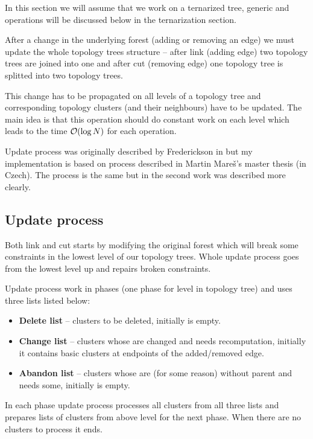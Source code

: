 In this section we will assume that we work on a ternarized tree, generic \Cut{}
and \Link{} operations will be discussed below in the ternarization section.

After a change in the underlying forest (adding or removing an edge) we must
update the whole topology trees structure -- after {\I link} (adding edge) two
topology trees are joined into one and after {\I cut} (removing edge) one
topology tree is splitted into two topology trees.

This change has to be propagated on all levels of a topology tree and
corresponding topology clusters (and their neighbours) have to be updated. The
main idea is that this operation should do constant work on each level which
leads to the time ${\cal O}(\log N)$ for each operation.

Update process was originally described by Frederickson in
\cite{DSforDynamicallyMaintainingRootedTrees} but my implementation is based on
process described in Martin Mareš's master thesis \cite{DGA} (in Czech). The
process is the same but in the second work was described more clearly.

\subsection{Update process}

Both link and cut starts by modifying the original forest which will break some
constraints in the lowest level of our topology trees. Whole update process
goes from the lowest level up and repairs broken constraints.

Update process work in phases (one phase for level in topology tree) and uses
three lists listed below:
\begin{itemize}
\item {\bf Delete list} -- clusters to be deleted, initially is empty.
\item {\bf Change list} -- clusters whose are changed and needs recomputation, initially
it contains basic clusters at endpoints of the added/removed edge.
\item {\bf Abandon list} -- clusters whose are (for some reason) without parent and
needs some, initially is empty.
\end{itemize}

In each phase update process processes all clusters from all three lists and
prepares lists of clusters from above level for the next phase. When there are
no clusters to process it ends.

